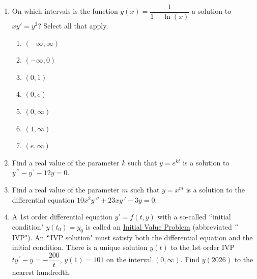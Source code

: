 \documentclass{ximera}
\begin{document}
\begin{enumerate}[label=(\arabic*)]
    \newpage

\item On which intervals is the function $y(x)=\dfrac{1}{1-\ln{(x)}}$ a solution to $xy'=y^2$?  Select all that apply.\\



\begin{enumerate}
\item $(-\infty,\infty)$\\
\item $(-\infty,0)$\\
\item $(0,1)$\\ %
\item $(0,e)$\\  %
\item $(0,\infty)$\\
\item $(1,\infty)$\\
\item $(e,\infty)$\\ %
\end{enumerate}

    
\item Find a real value of the parameter $k$ such that $y=e^{kt}$ is a solution to $y^{\,\prime\prime}-y^{\,\prime}-12y=0$.\\


\item Find a real value of the parameter $m$ such that $y=x^m$ is a solution to the differential equation $10x^2 y\,''+23xy\,'-3y=0$.\\





\item    A 1st order differential equation $y'=f(t,y)$ with a so-called $``$initial condition" $y(t_0)=y_0$ is called an \underline{Initial Value Problem} (abbreviated $``$IVP").  An $``$IVP solution" must satisfy both the differential equation and the initial condition.  There is a unique solution $y(t)$ to the 1st order IVP $ty^{\,\prime}-y=-\dfrac{200}{t}$, $y(1)=101$ on the interval $(0,\infty)$.  Find $y(2026)$ to the nearest hundredth.\\


\end{enumerate}
\end{document}
